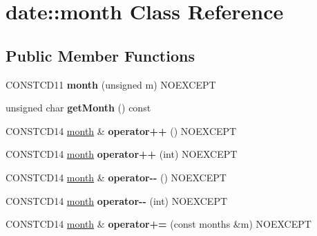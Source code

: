 \hypertarget{classdate_1_1month}{}\section{date\+::month Class Reference}
\label{classdate_1_1month}
\subsection*{Public Member Functions}
\begin{DoxyCompactItemize}
\item 
\mbox{\label{classdate_1_1month_a2f1d927dc7c891d12f104c7b252008fd}} 
C\+O\+N\+S\+T\+C\+D11 {\bfseries month} (unsigned m) N\+O\+E\+X\+C\+E\+PT
\item 
\mbox{\label{classdate_1_1month_a78eb4db0722d295e62975b928dde61d5}} 
unsigned char {\bfseries get\+Month} () const
\item 
\mbox{\label{classdate_1_1month_a4456f84f6cf4106dcefa48569ed07743}} 
C\+O\+N\+S\+T\+C\+D14 \mbox{\hyperlink{classdate_1_1month}{month}} \& {\bfseries operator++} () N\+O\+E\+X\+C\+E\+PT
\item 
\mbox{\label{classdate_1_1month_ab161b2691601f1b461b8ca96ea801d6c}} 
C\+O\+N\+S\+T\+C\+D14 \mbox{\hyperlink{classdate_1_1month}{month}} {\bfseries operator++} (int) N\+O\+E\+X\+C\+E\+PT
\item 
\mbox{\label{classdate_1_1month_a2f581f7ffbb1e1fc86aa190db7c13ded}} 
C\+O\+N\+S\+T\+C\+D14 \mbox{\hyperlink{classdate_1_1month}{month}} \& {\bfseries operator-\/-\/} () N\+O\+E\+X\+C\+E\+PT
\item 
\mbox{\label{classdate_1_1month_a09c876aeeb5242432f3484f0328a2e96}} 
C\+O\+N\+S\+T\+C\+D14 \mbox{\hyperlink{classdate_1_1month}{month}} {\bfseries operator-\/-\/} (int) N\+O\+E\+X\+C\+E\+PT
\item 
\mbox{\label{classdate_1_1month_adfd48bd6ab3ca3f4d74700e7de212c7b}} 
C\+O\+N\+S\+T\+C\+D14 \mbox{\hyperlink{classdate_1_1month}{month}} \& {\bfseries operator+=} (const months \&m) N\+O\+E\+X\+C\+E\+PT
\item 

\end{DoxyCompactItemize}
